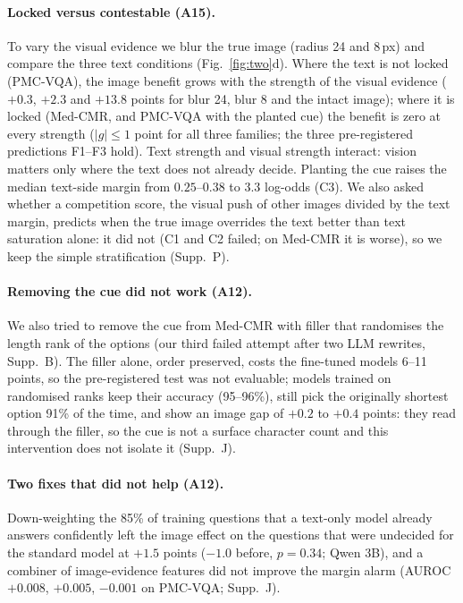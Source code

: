 \paragraph{Locked versus contestable (A15).}
To vary the visual evidence we blur the true image (radius 24 and 8\,px) and compare the three text conditions (Fig.~\ref{fig:two}d).
Where the text is not locked (PMC-VQA), the image benefit grows with the strength of the visual evidence ($+0.3$, $+2.3$ and $+13.8$ points for blur 24, blur 8 and the intact image); where it is locked (Med-CMR, and PMC-VQA with the planted cue) the benefit is zero at every strength ($|g|\le1$ point for all three families; the three pre-registered predictions F1--F3 hold).
Text strength and visual strength interact: vision matters only where the text does not already decide.
Planting the cue raises the median text-side margin from $0.25$--$0.38$ to $3.3$ log-odds (C3).
We also asked whether a competition score, the visual push of other images divided by the text margin, predicts when the true image overrides the text better than text saturation alone: it did not (C1 and C2 failed; on Med-CMR it is worse), so we keep the simple stratification (Supp.~P).

\paragraph{Removing the cue did not work (A12).}
We also tried to remove the cue from Med-CMR with filler that randomises the length rank of the options (our third failed attempt after two LLM rewrites, Supp.~B).
The filler alone, order preserved, costs the fine-tuned models 6--11 points, so the pre-registered test was not evaluable; models trained on randomised ranks keep their accuracy (95--96\%), still pick the originally shortest option 91\% of the time, and show an image gap of $+0.2$ to $+0.4$ points: they read through the filler, so the cue is not a surface character count and this intervention does not isolate it (Supp.~J).

\paragraph{Two fixes that did not help (A12).}
Down-weighting the 85\% of training questions that a text-only model already answers confidently left the image effect on the questions that were undecided for the standard model at $+1.5$ points ($-1.0$ before, $p=0.34$; Qwen 3B), and a combiner of image-evidence features did not improve the margin alarm (AUROC $+0.008$, $+0.005$, $-0.001$ on PMC-VQA; Supp.~J).

